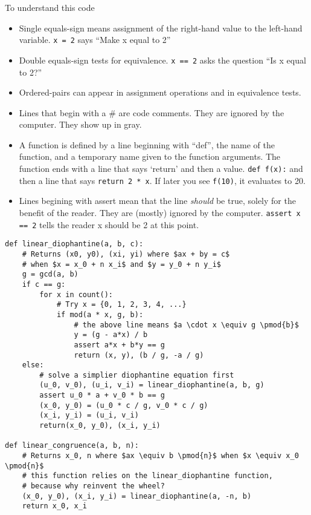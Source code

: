 To understand this code
\begin{itemize}
\item Single equals-sign means assignment of the right-hand value to the left-hand variable. \texttt{x = 2} says ``Make x equal to 2''
\item Double equals-sign tests for equivalence. \texttt{x == 2} asks the question ``Is x equal to 2?''
\item Ordered-pairs can appear in assignment operations and in equivalence tests.
\item Lines that begin with a \# are code comments. They are ignored by the computer. They show up in gray.
\item A function is defined by a line beginning with ``def'', the name of the function, and a temporary name given to the function arguments. The function ends with a line that says `return' and then a value. \texttt{def f(x):} and then a line that says \texttt{return 2 * x}. If later you see \texttt{f(10)}, it evaluates to 20.
\item Lines begining with assert mean that the line \textit{should} be true, solely for the benefit of the reader. They are (mostly) ignored by the computer. \texttt{assert x == 2} tells the reader x should be 2 at this point.
\end{itemize}


\begin{verbatim}
def linear_diophantine(a, b, c):
    # Returns (x0, y0), (xi, yi) where $ax + by = c$
    # when $x = x_0 + n x_i$ and $y = y_0 + n y_i$
    g = gcd(a, b)
    if c == g:
        for x in count():
            # Try x = {0, 1, 2, 3, 4, ...}
            if mod(a * x, g, b):
                # the above line means $a \cdot x \equiv g \pmod{b}$
                y = (g - a*x) / b
                assert a*x + b*y == g
                return (x, y), (b / g, -a / g)
    else:
        # solve a simplier diophantine equation first
        (u_0, v_0), (u_i, v_i) = linear_diophantine(a, b, g)
        assert u_0 * a + v_0 * b == g
        (x_0, y_0) = (u_0 * c / g, v_0 * c / g)
        (x_i, y_i) = (u_i, v_i)
        return(x_0, y_0), (x_i, y_i)

def linear_congruence(a, b, n):
    # Returns x_0, n where $ax \equiv b \pmod{n}$ when $x \equiv x_0 \pmod{n}$
    # this function relies on the linear_diophantine function,
    # because why reinvent the wheel?
    (x_0, y_0), (x_i, y_i) = linear_diophantine(a, -n, b)
    return x_0, x_i
\end{verbatim}

